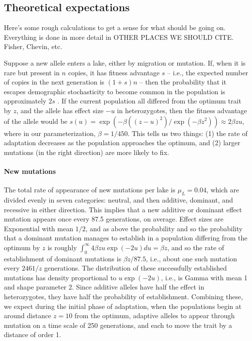 \documentclass{article}
\newcommand{\plr}[1]{\todo[linecolor=blue,backgroundcolor=blue!25,bordercolor=blue]{#1}}
\begin{document}


\subsection*{Theoretical expectations}
\plr{does this go first or second?}

Here's some rough calculations to get a sense for what should be going on.
Everything is done in more detail in OTHER PLACES WE SHOULD CITE.
Fisher, Chevin, etc.

Suppose a new allele enters a lake, either by migration or mutation.
If, when it is rare but present in $n$ copies,
it has fitness advantage $s$
-- i.e., the expected number of copies in the next generation is $(1+s)n$ --
then the probability that it escapes demographic stochasticity to become common in the population
is approximately $2s$ \citep{fisher,prob_fixation}.
If the current population all differed from the optimum trait by $z$,
and the allele has effect size $-u$ in heterozygotes,
then the fitness advantage of the allele would be
$s(u) = \exp(-\beta((z - u)^2) / \exp( - \beta z^2)) \approx 2 \beta z u$,
where in our parameterization, $\beta = 1 / 450$.
This tells us two things:
(1) the rate of adaptation decreases as the population approaches the optimum,
and (2) larger mutations (in the right direction) are more likely to fix.

\paragraph{New mutations}
The total rate of appearance of new mutations per lake is $\mu_L = 0.04$,
which are divided evenly in seven categories: neutral, and then additive, dominant, and recessive
in either direction.
This implies that a new additive or dominant effect mutation appears once every 87.5 generations,
on average.
Effect sizes are Exponential with mean $1/2$, and as above the probability
and so the probability that a dominant mutation manages to establish in a population differing from
the optimum by $z$ is roughly
$\int_0^\infty 4 \beta z u \exp(-2u) du = \beta z$,
and so the rate of establishment of dominant mutations is $\beta z / 87.5$,
i.e., about one such mutation every $2461/z$ generations.
The distribution of these successfully established mutations 
has density proportional to $u \exp(-2u)$, i.e., is Gamma with mean 1 and shape parameter 2.
Since additive alleles have half the effect in heterozygotes,
they have half the probability of establishment.
Combining these, we expect during the initial phase of adaptation,
when the populations begin at around distance $z=10$ from the optimum,
adaptive alleles to appear through mutation on a time scale of 250 generations,
and each to move the trait by a distance of order 1.
\end{document}

